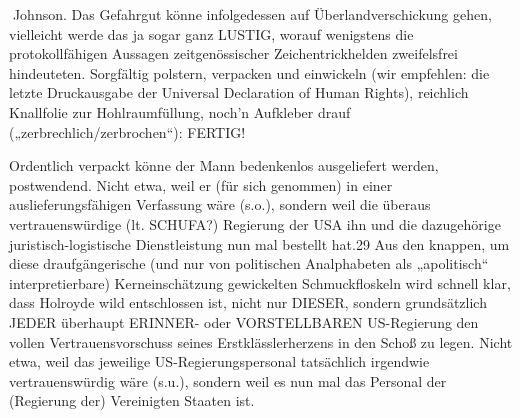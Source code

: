 \begin{multicols}{2}

Johnson. Das Gefahrgut könne infolgedessen auf Überlandverschickung gehen, vielleicht werde das ja sogar
ganz LUSTIG, worauf wenigstens die protokollfähigen
Aussagen zeitgenössischer Zeichentrickhelden zweifelsfrei hindeuteten. Sorgfältig polstern, verpacken und
einwickeln (wir empfehlen: die letzte Druckausgabe der
Universal Declaration of Human Rights), reichlich Knallfolie zur Hohlraumfüllung, noch’n Aufkleber drauf („zerbrechlich/zerbrochen“): FERTIG!

Ordentlich verpackt könne der Mann bedenkenlos ausgeliefert werden, postwendend. Nicht etwa, weil er (für
sich genommen) in einer auslieferungsfähigen Verfassung wäre (s.o.), sondern weil die überaus vertrauenswürdige (lt. SCHUFA?) Regierung der USA ihn und die
dazugehörige juristisch-logistische Dienstleistung nun
mal bestellt hat.29 Aus den knappen, um diese draufgängerische (und nur von politischen Analphabeten
als „apolitisch“ interpretierbare) Kerneinschätzung gewickelten Schmuckfloskeln wird schnell klar, dass Holroyde wild entschlossen ist, nicht nur DIESER, sondern
grundsätzlich JEDER überhaupt ERINNER- oder VORSTELLBAREN US-Regierung den vollen Vertrauensvorschuss seines Erstklässlerherzens in den Schoß zu legen.
Nicht etwa, weil das jeweilige US-Regierungspersonal
tatsächlich irgendwie vertrauenswürdig wäre (s.u.), sondern weil es nun mal das Personal der (Regierung der)
Vereinigten Staaten ist.


\end{multicols}
